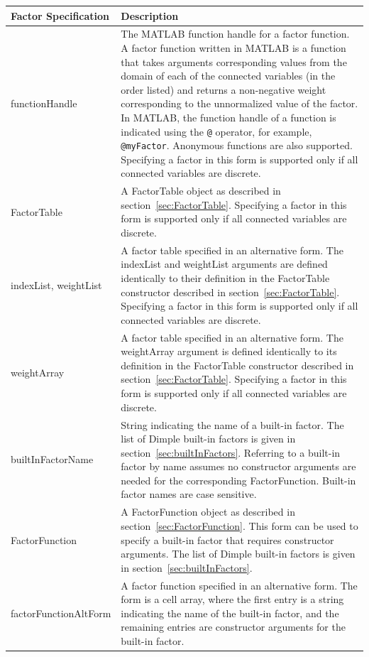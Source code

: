 \ifmatlab
\begin{longtable} {l p{10cm}}
Factor Specification & Description \\
\hline
\endhead
%
functionHandle & The MATLAB function handle for a factor function.  A factor function written in MATLAB is a function that takes arguments corresponding values from the domain of each of the connected variables (in the order listed) and returns a non-negative weight corresponding to the unnormalized value of the factor.  In MATLAB, the function handle of a function is indicated using the \texttt{@} operator, for example, \texttt{@myFactor}.  Anonymous functions are also supported.  Specifying a factor in this form is supported only if all connected variables are discrete.  \\
%
FactorTable & A FactorTable object as described in section~\ref{sec:FactorTable}.  Specifying a factor in this form is supported only if all connected variables are discrete. \\
%
indexList, weightList & A factor table specified in an alternative form.  The indexList and weightList arguments are defined identically to their definition in the FactorTable constructor described in section~\ref{sec:FactorTable}. Specifying a factor in this form is supported only if all connected variables are discrete. \\
%
weightArray & A factor table specified in an alternative form.  The weightArray argument is defined identically to its definition in the FactorTable constructor described in section~\ref{sec:FactorTable}. Specifying a factor in this form is supported only if all connected variables are discrete. \\
%
builtInFactorName & String indicating the name of a built-in factor.  The list of Dimple built-in factors is given in section~\ref{sec:builtInFactors}.  Referring to a built-in factor by name assumes no constructor arguments are needed for the corresponding FactorFunction.  Built-in factor names are case sensitive.  \\
%
FactorFunction & A FactorFunction object as described in section~\ref{sec:FactorFunction}. This form can be used to specify a built-in factor that requires constructor arguments.  The list of Dimple built-in factors is given in section~\ref{sec:builtInFactors}.\\
%
factorFunctionAltForm & A factor function specified in an alternative form.  The form is a cell array, where the first entry is a string indicating the name of the built-in factor, and the remaining entries are constructor arguments for the built-in factor.  \\

\end{longtable}
